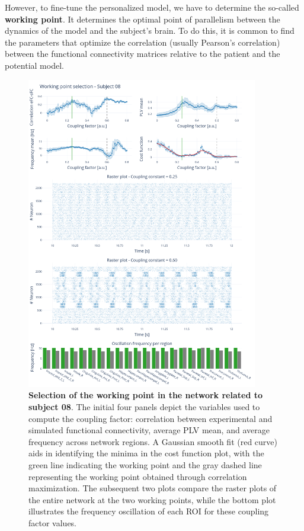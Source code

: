 \documentclass[../main.tex]{subfiles}
\begin{document}
However, to fine-tune the personalized model, we have to determine the so-called \textbf{working point}.
It determines the optimal point of parallelism between the dynamics of the model and the subject's brain.
To do this, it is common to find the parameters that optimize the correlation (usually Pearson's correlation) between the functional connectivity matrices relative to the patient and the potential model.
\begin{figure}[htbp]
    \centering
    \includegraphics[width=0.9\textwidth]{chapter3/figures/working-point.png}
    \caption{\textbf{Selection of the working point in the network related to subject 08}.
    The initial four panels depict the variables used to compute the coupling factor: correlation between experimental and simulated functional connectivity, average PLV mean, and average frequency across network regions.
    A Gaussian smooth fit (red curve) aids in identifying the minima in the cost function plot, with the green line indicating the working point and the gray dashed line representing the working point obtained through correlation maximization.
    The subsequent two plots compare the raster plots of the entire network at the two working points, while the bottom plot illustrates the frequency oscillation of each ROI for these coupling factor values.}
    \label{fig:working-point-determination}
\end{figure}
\end{document}

